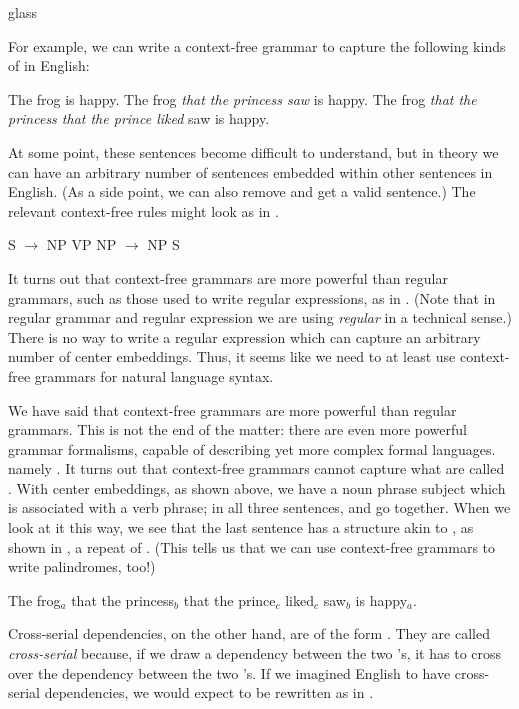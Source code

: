 \begin{tblsfilledsymbol}{}{glass}
\begin{underthehood}
For example, we can write a context-free grammar to capture the
following kinds of  in English:

\ea \ea The frog is happy.
    \ex \label{ex:frog2} The frog \emph{that the princess saw} is happy.
    \ex \label{ex:frog3} The frog \emph{that the princess that the prince liked}    saw is happy.
\z 
\z 


At some point, these sentences become difficult to understand, but in
theory we can have an arbitrary number of sentences embedded within
other sentences in English.  (As a side point, we can also remove  and get a valid sentence.)  The relevant context-free rules might
look as in .

\ea \label{ex:cfg-embed}
    \ea S $\to$ NP VP
    \ex NP $\to$ NP S
\z 
\z 

It turns out that context-free grammars are more powerful than regular
grammars, such as those used to write regular expressions, as in
. (Note that in regular grammar and regular
expression we are using \emph{regular} in a technical sense.) 
There is no way to write a regular expression which can capture an
arbitrary number of center embeddings.  Thus, it seems like we need to
at least use context-free grammars for natural language syntax.

We have said that context-free grammars are more powerful than regular grammars.
This is not the end of the matter: there are even more powerful grammar formalisms,
capable of describing yet more complex formal languages.
namely .  It turns out that
context-free grammars cannot capture what are called
.  With center embeddings, as shown
above, we have a noun phrase subject which is associated with a verb
phrase; in all three sentences,  and  go
together.  When we look at it this way, we see that the last sentence
has a structure akin to , as shown in , a repeat of .
(This tells us that we can use context-free grammars to write
palindromes, too!)  


\ea \label{ex:frog} The frog$_a$ that the princess$_b$ that the
  prince$_c$ liked$_c$ saw$_b$ is happy$_a$.
\z 

Cross-serial dependencies, on the other hand, are of the form
.  They are called \emph{cross-serial} because, if we draw a dependency between the two  's, it has to cross over the
dependency between the two 's. If we imagined English to
have cross-serial dependencies, we would expect  to be
rewritten as in .


\end{underthehood}
\end{tblsfilledsymbol}
